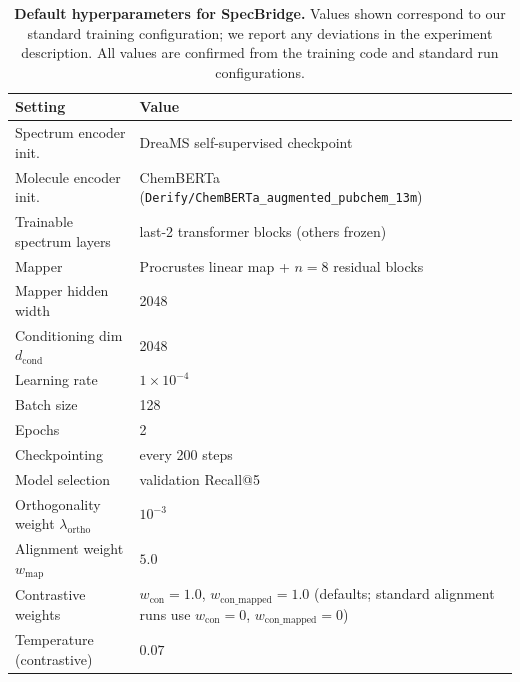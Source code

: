
\begin{table}[htbp]
\centering
\small
\setlength{\tabcolsep}{6pt}
\renewcommand{\arraystretch}{1.15}
\begin{tabular}{ll}
\toprule
\textbf{Setting} & \textbf{Value} \\
\midrule
Spectrum encoder init. & DreaMS self-supervised checkpoint \\
Molecule encoder init. & ChemBERTa (\texttt{Derify/ChemBERTa\_augmented\_pubchem\_13m}) \\
Trainable spectrum layers & last-2 transformer blocks (others frozen) \\
Mapper & Procrustes linear map + $n=8$ residual blocks \\
Mapper hidden width & 2048 \\
Conditioning dim $d_{\mathrm{cond}}$ & 2048 \\
Learning rate & $1\times 10^{-4}$ \\
Batch size & 128 \\
Epochs & 2 \\
Checkpointing & every 200 steps \\
Model selection & validation Recall@5 \\
Orthogonality weight $\lambda_{\text{ortho}}$ & $10^{-3}$ \\
Alignment weight $w_{\text{map}}$ & $5.0$ \\
Contrastive weights & $w_{\text{con}}=1.0$, $w_{\text{con\_mapped}}=1.0$ (defaults; standard alignment runs use $w_{\text{con}}=0$, $w_{\text{con\_mapped}}=0$) \\
Temperature (contrastive) & $0.07$ \\
\bottomrule
\end{tabular}
\caption{\textbf{Default hyperparameters for SpecBridge.}
Values shown correspond to our standard training configuration; we report any deviations in the experiment description.
All values are confirmed from the training code and standard run configurations.}
\label{tab:impl_hparams}
\end{table}

